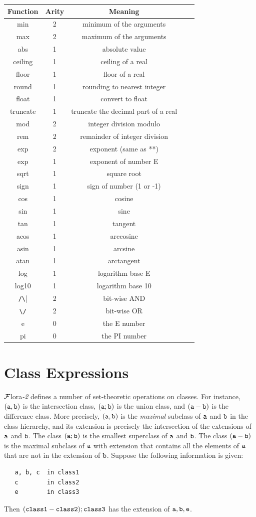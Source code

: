 \documentclass[11pt]{article}
\newcommand{\FLORA}{{\mbox{\sc ${\cal F}${lora}\rm\emph{-2}}}\xspace}
\begin{document}
\begin{tabular}{|c|c|c|c|c|}
\hline
Function  & Arity & Meaning  \\ \hline
min & 2 & minimum of the arguments\\
max & 2 & maximum of the arguments\\
abs & 1 & absolute value \\
ceiling & 1 & ceiling of a real \\
floor & 1 & floor of a real \\
round & 1 & rounding to nearest integer \\
float & 1 & convert to float \\
truncate & 1 & truncate the decimal part of a real \\
mod & 2 & integer division modulo \\
rem & 2 & remainder of integer division\\
exp & 2 & exponent (same as **)\\
exp & 1 & exponent of number E\\
sqrt & 1 & square root\\
sign & 1 & sign of number (1 or -1)\\
cos & 1 & cosine \\
sin & 1 & sine \\
tan & 1 & tangent \\
acos & 1 & arccosine\\ 
asin & 1 & arcsine\\ 
atan & 1 & arctangent\\ 
log & 1 & logarithm base E \\
log10 & 1 & logarithm base 10 \\
\verb|/\| & 2 & bit-wise AND \\
\verb|\/| & 2 & bit-wise OR \\
e & 0 & the E number\\
pi & 0 & the PI number\\
\hline
\end{tabular}


\section{Class Expressions}
\label{sec-class-expr}

\FLORA defines a number of set-theoretic
operations on classes. For instance, $\tt (a,b)$ is the
intersection class, $\tt (a;b)$ is the union class, and $\tt (a-b)$ is
the difference class. More precisely, $\tt (a,b)$ is the \emph{maximal}
subclass of $\tt a$ and $\tt b$ in the class hierarchy, and its extension is
precisely the intersection of the extensions of $\tt a$ and $\tt b$. The class
$\tt (a;b)$ is the smallest superclass of $\tt a$ and $\tt b$. The class $\tt (a-b)$ is the
maximal subclass of $\tt a$ with extension that contains all the elements of
$\tt a$ that are not in the extension of $\tt b$.
Suppose
the following information is given:
\begin{verbatim}
   a, b, c  in class1
   c        in class2
   e        in class3
\end{verbatim}
Then $\tt (class1 - class2) ; class3$ has the extension of $\tt a,b,e$.
\end{document}
